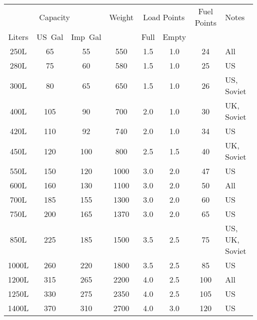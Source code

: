 \begin{twocolumntablefloat}
\begin{twocolumntable}
{
\begin{tabular}{cccccccl}
\toprule
\multicolumn{3}{c}{Capacity}&
Weight&
\multicolumn{2}{c}{Load Points}&
Fuel Points&
Notes\\
\cmidrule{1-3}
\cmidrule{5-6}
Liters&US~Gal&Imp~Gal&&Full&Empty&&\\
\midrule
\phantom{00}250L&\phantom{00}65&\phantom{00}55&\phantom{00}550&\phantom{0}1.5&\phantom{0}1.0&\phantom{0}24&All\\
\phantom{00}280L&\phantom{00}75&\phantom{00}60&\phantom{00}580&\phantom{0}1.5&\phantom{0}1.0&\phantom{0}25&US\\
\phantom{00}300L&\phantom{00}80&\phantom{00}65&\phantom{00}650&\phantom{0}1.5&\phantom{0}1.0&\phantom{0}26&US, Soviet\\
\phantom{00}400L&\phantom{0}105&\phantom{00}90&\phantom{00}700&\phantom{0}2.0&\phantom{0}1.0&\phantom{0}30&UK, Soviet\\
\phantom{00}420L&\phantom{0}110&\phantom{00}92&\phantom{00}740&\phantom{0}2.0&\phantom{0}1.0&\phantom{0}34&US\\
\phantom{00}450L&\phantom{0}120&\phantom{0}100&\phantom{00}800&\phantom{0}2.5&\phantom{0}1.5&\phantom{0}40&UK, Soviet\\
\phantom{00}550L&\phantom{0}150&\phantom{0}120&\phantom{0}1000&\phantom{0}3.0&\phantom{0}2.0&\phantom{0}47&US\\
\phantom{00}600L&\phantom{0}160&\phantom{0}130&\phantom{0}1100&\phantom{0}3.0&\phantom{0}2.0&\phantom{0}50&All\\
\phantom{00}700L&\phantom{0}185&\phantom{0}155&\phantom{0}1300&\phantom{0}3.0&\phantom{0}2.0&\phantom{0}60&US\\
\phantom{00}750L&\phantom{0}200&\phantom{0}165&\phantom{0}1370&\phantom{0}3.0&\phantom{0}2.0&\phantom{0}65&US\\
\phantom{00}850L&\phantom{0}225&\phantom{0}185&\phantom{0}1500&\phantom{0}3.5&\phantom{0}2.5&\phantom{0}75&US, UK, Soviet\\
\phantom{0}1000L&\phantom{0}260&\phantom{0}220&\phantom{0}1800&\phantom{0}3.5&\phantom{0}2.5&\phantom{0}85&US\\
\phantom{0}1200L&\phantom{0}315&\phantom{0}265&\phantom{0}2200&\phantom{0}4.0&\phantom{0}2.5&\phantom{}100&All\\
\phantom{0}1250L&\phantom{0}330&\phantom{0}275&\phantom{0}2350&\phantom{0}4.0&\phantom{0}2.5&\phantom{}105&US\\
\phantom{0}1400L&\phantom{0}370&\phantom{0}310&\phantom{0}2700&\phantom{0}4.0&\phantom{0}3.0&\phantom{}120&US\\

\end{tabular}}
\end{twocolumntable}
\end{twocolumntablefloat}
